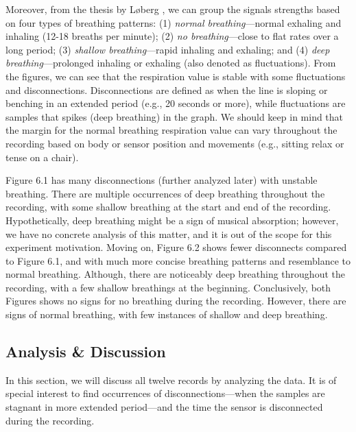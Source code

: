 Moreover, from the thesis by Løberg \cite{fredrik}, we can group the signals strengths based on four types of breathing patterns: (1) \textit{normal breathing}---normal exhaling and inhaling (12-18 breaths per minute); (2) \textit{no breathing}---close to flat rates over a long period; (3) \textit{shallow breathing}---rapid inhaling and exhaling; and (4) \textit{deep breathing}---prolonged inhaling or exhaling (also denoted as fluctuations). From the figures, we can see that the respiration value is stable with some fluctuations and disconnections. Disconnections are defined as when the line is sloping or benching in an extended period (e.g., 20 seconds or more), while fluctuations are samples that spikes (deep breathing) in the graph. We should keep in mind that the margin for the normal breathing respiration value can vary throughout the recording based on body or sensor position and movements (e.g., sitting relax or tense on a chair). 

Figure 6.1 has many disconnections (further analyzed later) with unstable breathing. There are multiple occurrences of deep breathing throughout the recording, with some shallow breathing at the start and end of the recording. Hypothetically, deep breathing might be a sign of musical absorption; however, we have no concrete analysis of this matter, and it is out of the scope for this experiment motivation. Moving on, Figure 6.2 shows fewer disconnects compared to Figure 6.1, and with much more concise breathing patterns and resemblance to normal breathing. Although, there are noticeably deep breathing throughout the recording, with a few shallow breathings at the beginning. Conclusively, both Figures shows no signs for no breathing during the recording. However, there are signs of normal breathing, with few instances of shallow and deep breathing. 

\subsection{Analysis \& Discussion}
In this section, we will discuss all twelve records by analyzing the data. It is of special interest to find occurrences of disconnections---when the samples are stagnant in more extended period---and the time the sensor is disconnected during the recording.

